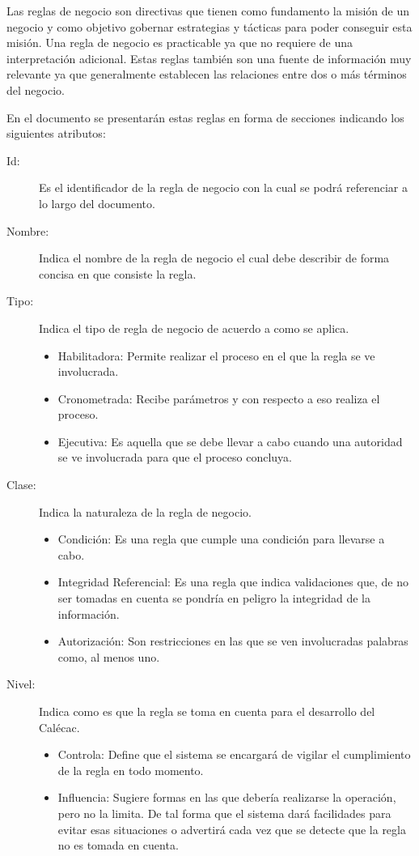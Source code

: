 Las reglas de negocio son directivas que tienen como fundamento la misión de un negocio y como objetivo gobernar estrategias y tácticas para poder conseguir esta misión. Una regla de negocio es practicable ya que no requiere de una interpretación adicional. Estas reglas también son una fuente de información muy relevante ya que generalmente establecen las relaciones entre dos o más términos del negocio.

En el documento se presentarán estas reglas en forma de secciones indicando los siguientes atributos:

\begin{description}
	\item[Id:] Es el identificador de la regla de negocio con la cual se podrá referenciar a lo largo del documento.
	\item[Nombre:] Indica el nombre de la regla de negocio el cual debe describir de forma concisa en que consiste la regla.
	\item[Tipo:] Indica el tipo de regla de negocio de acuerdo a como se aplica.
		\begin{itemize}
			\item Habilitadora: Permite realizar el proceso en el que la regla se ve involucrada.
			\item Cronometrada: Recibe parámetros y con respecto a eso realiza el proceso.
			\item Ejecutiva: Es aquella que se debe llevar a cabo cuando una autoridad se ve involucrada para que el proceso concluya.
		\end{itemize}
	\item[Clase:] Indica la naturaleza de la regla de negocio.
		\begin{itemize}
			\item Condición: Es una regla que cumple una condición para llevarse a cabo.
			\item Integridad Referencial: Es una regla que indica validaciones que, de no ser tomadas en cuenta se pondría en peligro la integridad de la información.
			\item Autorización: Son restricciones en las que se ven involucradas palabras como, al menos uno.
		\end{itemize}

	\item[Nivel:] Indica como es que la regla se toma en cuenta para el desarrollo del Calécac.
		\begin{itemize}
			\item Controla: Define que el sistema se encargará de vigilar el cumplimiento de la regla en todo momento.
			\item Influencia: Sugiere formas en las que debería realizarse la operación, pero no la limita. De tal forma que el sistema dará facilidades para evitar esas situaciones o advertirá cada vez que se detecte que la regla no es tomada en cuenta.
		\end{itemize}


\end{description}
